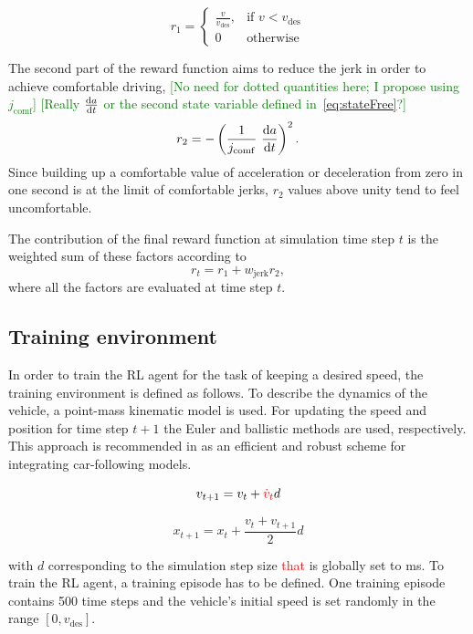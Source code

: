 \documentclass[review]{elsarticle}
\providecommand{\red}[1]{\textcolor{red}{#1}}
\providecommand{\green}[1]{\textcolor{green}{#1}}
\providecommand{\martin}[1]{\red{#1}} %
\providecommand{\martinc}[1]{\green{[#1]}} %
\providecommand{\sub}[1]{_{\mathrm{#1}}}  %
\providecommand{\3}{{\ss}}
\begin{document}
\begin{equation}
\label{eq:r1Free}
	r_1  = 
	\begin{cases}
	\frac{v}{v\sub{des}},
	& \text{if } v < v\sub{des}\\
	0
	 & \text{otherwise}
	\end{cases}
\end{equation}

The second part of the reward function aims to reduce the jerk in
order to achieve comfortable driving, \martinc{No need for dotted
  quantities here; I propose using $j\sub{comf}$} \martinc{Really
  $\dv{a}{t}$ or the second state variable defined in~\eqref{eq:stateFree}?}
\begin{equation}
\label{eq:r2Free}
r_2 = -\left(\frac{1}{j\sub{comf}} \ \dv{a}{t}\right)^2.
\end{equation}
%
Since building up a comfortable value of acceleration or deceleration
from zero in one second is at the limit of comfortable jerks, $r_2$
values above unity tend to feel uncomfortable.


The contribution of the final reward function at simulation time step $t$ is the weighted
sum of these factors according to
\begin{equation}
\label{rt1}
r_t =r_1 + w\sub{jerk} r_2,
\end{equation}
where all the factors are evaluated at time step $t$. 


\subsection{Training environment}
\label{training_environment1}
In order to train the RL agent for the task of keeping a desired
speed, the training environment is defined as follows. To describe the
dynamics of the vehicle, a point-mass kinematic model is used. For
updating the speed and position for time step $t + 1$ the Euler and
ballistic methods are used, respectively. This approach is recommended in \cite{numericalUpdateMethodsTreiber} as an efficient
and robust scheme for integrating car-following models.

\begin{equation}
	v_{t+1} = v_{t} + \martin{\dot{v}_{t}} d
\end{equation}

\begin{equation}
x_{t+1} = x_{t} + \frac{v_{t} + v_{t+1}}{2} d
\end{equation}


with $d$ corresponding to the simulation step size \martin{that} is globally
set to \unit[100]{ms}. To train the RL agent, a training episode has to be defined. One training episode contains 500 time steps and the vehicle's initial speed is set randomly in the range $[0,v\sub{des}]$.
\end{document}
